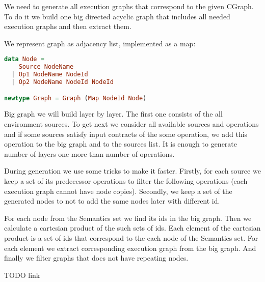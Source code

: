 We need to generate all execution graphs that correspond to the given CGraph.
To do it we build one big directed acyclic graph that includes all needed execution graphs and then extract them.

We represent graph as adjacency list, implemented as a map:

\begin{lstlisting}[language=Haskell]
data Node =
    Source NodeName
  | Op1 NodeName NodeId
  | Op2 NodeName NodeId NodeId

newtype Graph = Graph (Map NodeId Node)
\end{lstlisting}

Big graph we will build layer by layer.
The first one consists of the all environment sources.
To get next we consider all available sources and operations and if some sources satisfy input contracts of the some operation, we add this operation to the big graph and to the sources list.
It is enough to generate number of layers one more than number of operations.

During generation we use some tricks to make it faster.
Firstly, for each source we keep a set of its predecessor operations to filter the following operations (each execution graph cannot have node copies).
Secondly, we keep a set of the generated nodes to not to add the same nodes later with different id.

For each node from the Semantics set we find its ids in the big graph.
Then we calculate a cartesian product of the such sets of ids.
Each element of the cartesian product is a set of ids that correspond to the each node of the Semantics set.
For each element we extract corresponding execution graph from the big graph.
And finally we filter graphs that does not have repeating nodes.

TODO link 
